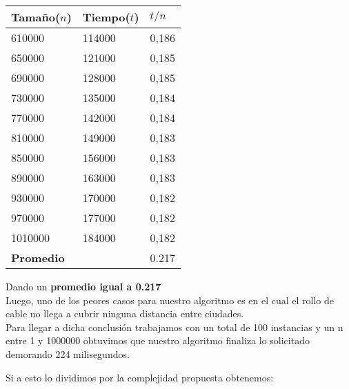 \begin{table}[H]

    \begin{tabular}{ | l | l |l |}
    \hline
		Tamaño($n$) & Tiempo($t$) & \textbf{$t /n$}  \\ \hline
610000 & 114000 & 0,186 \\ \hline
650000 & 121000 & 0,185 \\ \hline
690000 & 128000 & 0,185 \\ \hline
730000 & 135000 & 0,184 \\ \hline
770000 & 142000 & 0,184 \\ \hline
810000 & 149000 & 0,183 \\ \hline
850000 & 156000 & 0,183 \\ \hline
890000 & 163000 & 0,183 \\ \hline
930000 & 170000 & 0,182 \\ \hline
970000 & 177000 & 0,182 \\ \hline
1010000 & 184000 & 0,182 \\ \hline

\textbf{Promedio} & & 0.217 \\ \hline

    \end{tabular}
\end{table}

Dando un \textbf{promedio igual a 0.217 }\\

Luego, uno de los peores casos para nuestro algoritmo es en el cual el rollo de cable no llega a cubrir ninguna distancia entre ciudades.\\

Para llegar a dicha conclusi\'on trabajamos con un total de 100 instancias y un n entre 1 y 1000000 obtuvimos que nuestro
algoritmo finaliza lo solicitado demorando 224 milisegundos.\\

\vspace*{0.3cm} \vspace*{0.3cm}
  \begin{center}
  \end{center}
  \vspace*{0.3cm}

Si a esto lo dividimos por la complejidad propuesta obtenemos:\\

\vspace*{0.3cm} \vspace*{0.3cm}
  \begin{center}
  \end{center}
  \vspace*{0.3cm}
  
